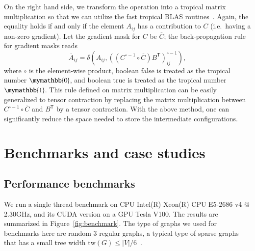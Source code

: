 \documentclass[onefignum, onetabnum]{siamart190516}
\newcommand{\<}{\langle}
\renewcommand{\>}{\rangle}
\begin{document}
On the right hand side, we transform the operation into a tropical matrix multiplication so that we can utilize the fast tropical BLAS routines~\cite{TropicalGEMM}.
Again, the equality holds if and only if the element $A_{ij}$ has a contribution to $C$ (i.e.\ having a non-zero gradient).
Let the gradient mask for $C$ be $\overline C$; the back-propagation rule for gradient masks reads
\begin{equation}
\overline{A}_{ij} = \delta \left(A_{ij}, \left( \left( C^{\circ-1} \circ \overline C \right) B^{\mathsf{T}} \right)_{ij}^{\circ -1} \right),
\end{equation}
where $\circ$ is the element-wise product, boolean false is treated as the tropical number $\mymathbb{0}$, and boolean true is treated as the tropical number $\mymathbb{1}$.
This rule defined on matrix multiplication can be easily generalized to tensor contraction by replacing the matrix multiplication between $C^{\circ-1} \circ \overline C$ and $B^{\mathsf{T}}$ by a tensor contraction.
With the above method, one can significantly reduce the space needed to store the intermediate configurations.

\section{Benchmarks and case studies}
\subsection{Performance benchmarks}
We run a single thread benchmark on CPU Intel(R) Xeon(R) CPU E5-2686 v4 @ 2.30GHz,
and its CUDA version on a GPU Tesla V100.
The results are summarized in Figure~\ref{fig:benchmark}.
The type of graphs we used for benchmarks here are random 3 regular graphs, a typical type of sparse graphs that has a small tree width $\text{tw}(G) \leq |V|/6$~\cite{Fomin2006}.
\end{document}

